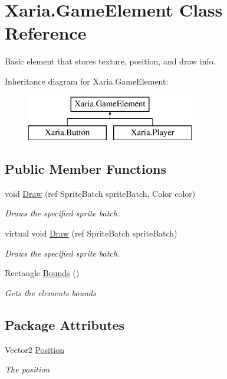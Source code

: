 \hypertarget{classXaria_1_1GameElement}{}\section{Xaria.\+Game\+Element Class Reference}
\label{classXaria_1_1GameElement}


Basic element that stores texture, position, and draw info.  


Inheritance diagram for Xaria.\+Game\+Element\+:\begin{figure}[H]
\begin{center}
\leavevmode
\includegraphics[height=2.000000cm]{classXaria_1_1GameElement}
\end{center}
\end{figure}
\subsection*{Public Member Functions}
\begin{DoxyCompactItemize}
\item 
void \hyperlink{classXaria_1_1GameElement_a7f93dc93e970e72a5540924e06d28c92}{Draw} (ref Sprite\+Batch sprite\+Batch, Color color)
\begin{DoxyCompactList}\small\item\em Draws the specified sprite batch. \end{DoxyCompactList}\item 
virtual void \hyperlink{classXaria_1_1GameElement_a812e0ffbe54519a3fb14a49115bf43d9}{Draw} (ref Sprite\+Batch sprite\+Batch)
\begin{DoxyCompactList}\small\item\em Draws the specified sprite batch. \end{DoxyCompactList}\item 
Rectangle \hyperlink{classXaria_1_1GameElement_a2b050e61aea8232eba3e820b14c98656}{Bounds} ()
\begin{DoxyCompactList}\small\item\em Gets the element\textquotesingle{}s bounds \end{DoxyCompactList}\end{DoxyCompactItemize}
\subsection*{Package Attributes}
\begin{DoxyCompactItemize}
\item 
Vector2 \hyperlink{classXaria_1_1GameElement_aca8d4e3746e4ec94a95bd10275512fbc}{Position}
\begin{DoxyCompactList}\small\item\em The position \end{DoxyCompactList}\end{DoxyCompactItemize}
